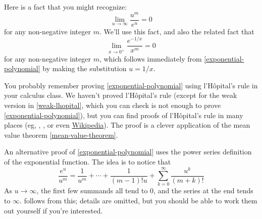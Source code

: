 \begin{remark} \label{exponential-limit}
	Here is a fact that you might recognize:
	\begin{equation} \label{exponential-polynomial} \lim_{u \to \infty} \frac{u^m}{e^u} = 0 \end{equation}
	for any non-negative integer $m$. We'll use this fact, and also the related fact that
	\[ \lim_{x \to 0^+} \frac{e^{-1/x}}{x^m} = 0 \]
	for any non-negative integer $m$, which follows immediately from \cref{exponential-polynomial} by making the substitution $u = 1/x$.
	
	You probably remember proving \cref{exponential-polynomial} using l'H\^{o}pital's rule in your calculus class. We haven't proved l'H\^{o}pital's rule (except for the weak version in \cref{weak-lhopital}, which you can check is not enough to prove \cref{exponential-polynomial}), but you can find proofs of l'H\^opital's rule in many places (eg, \cite[theorem 4.15]{protter-morrey}, \cite[theorem 5.13]{rudin}, or even \href{https://en.wikipedia.org/wiki/L\%27hopital\%27s_rule}{Wikipedia}). The proof is a clever application of the mean value theorem \ref{mean-value-theorem}. 
	
	An alternative proof of \cref{exponential-polynomial} uses the power series definition of the exponential function. The idea is to notice that
	\[ \frac{e^u}{u^m} = \frac{1}{u^m} + \dotsb + \frac{1}{(m-1)!u} + \sum_{k = 0}^\infty \frac{u^k}{(m+k)!} \]
	As $u \to \infty$, the first few summands all tend to 0, and the series at the end tends to $\infty$.  follows from this; details are omitted, but you should be able to work them out yourself if you're interested.
\end{remark} 


